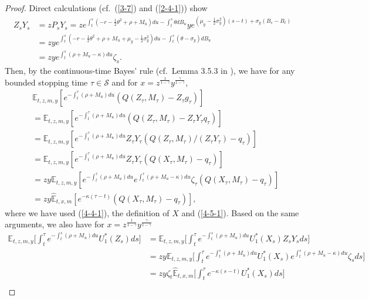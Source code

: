 \documentclass[a4paper,11pt]{amsart}
\numberwithin{equation}{section}
\newcommand{\blue}[1]{{\color{black}#1}}
\begin{document}
{\begin{proof}
Direct calculations (cf.\ (\ref{3-7}) and (\ref{2-4-1})) show 
\begin{align}\label{4-5-1}
Z_s Y_s &= z P_s Y_s= ze^{\int^s_t (-r -\frac{1}{2}\theta^2+\rho+ M_u) du  -\int^s_t \theta dB_u} y e^{(\mu_y -\frac{1}{2}\sigma_y^2)(s-t)+ \sigma_y (B_s-B_t)}\nonumber \\
&=z y e^{\int^s_t (-r -\frac{1}{2}\theta^2+\rho+ M_u +\mu_y -\frac{1}{2}\sigma_y^2  ) du  -\int^s_t (\theta-\sigma_y) dB_u  }\nonumber \\
&=z y e^{\int^s_t (\rho+ M_u-\kappa) du} \zeta_s.
\end{align}
Then, by the continuous-time Bayes' rule (cf.\ Lemma 3.5.3 in \citet{karatzas2012brownian}), we have \blue{for any bounded stopping time $\tau\in\mathcal S$} and for $x=z^{\frac{1}{1-\gamma}}y^{\frac{\gamma}{1-\gamma}}$,
\begin{align}\label{4-6}
&\mathbb{E}_{t,z,m,y}[e^{-\int^{\tau}_t (\rho+ M_u) du}(Q( Z_{\tau}, M_{\tau})-Z_{\tau}g_\tau ) ]\nonumber\\
&=\mathbb{E}_{t,z,m,y}[e^{-\int^{\tau}_t (\rho+ M_u) du}(Q( Z_{\tau}, M_{\tau})-Z_{\tau}Y_\tau q_\tau ) ]\nonumber\\
&=\mathbb{E}_{t,z,m,y}[e^{-\int^{\tau}_t (\rho+ M_u) du}Z_\tau Y_\tau (Q( Z_{\tau}, M_{\tau})/(Z_\tau Y_\tau)- q_\tau ) ]\nonumber\\
&=\mathbb{E}_{t,z,m,y}[e^{-\int^{\tau}_t (\rho+ M_u) du}Z_\tau Y_\tau (Q( X_\tau, M_\tau)- q_\tau ) ]\nonumber \\
&=zy\mathbb{E}_{t,z,m,y}[e^{-\int^{\tau}_t (\rho+ M_u) du} e^{\int^\tau_t (\rho+ M_u-\kappa) du} \zeta_\tau (Q( X_\tau, M_\tau)- q_\tau ) ]\nonumber\\
&=zy\widehat{\mathbb{E}}_{t,x,m}[e^{-\kappa(\tau-t)}  (Q(X_\tau, M_\tau)- q_\tau ) ],
\end{align}
where we have used (\ref{4-4-1}), the definition of $X$ and (\ref{4-5-1}).
Based on the same arguments, we also have for $x=z^{\frac{1}{1-\gamma}}y^{\frac{\gamma}{1-\gamma}}$
\begin{align}\label{4-7}
\mathbb{E}_{t,z,m,y}\bigg[    \int_t^{\tau }  e^{-\int^s_t (\rho+ M_u) du} {U}^\ast_1(Z_s) ds\bigg]&= \mathbb{E}_{t,z,m,y}\bigg[    \int_t^{\tau }  e^{-\int^s_t (\rho+ M_u) du} {U}^\ast_1(X_s) Z_sY_s ds\bigg]\nonumber\\
&=  z y\mathbb{E}_{t,z,m,y}\bigg[    \int_t^{\tau }  e^{-\int^s_t (\rho+ M_u) du} {U}^\ast_1(X_s) e^{\int^s_t (\rho+ M_u-\kappa) du} \zeta_s ds\bigg]\nonumber\\
&= zy\zeta_t \widehat{\mathbb{E}}_{t,x,m}\bigg[    \int_t^{\tau }  e^{-\kappa(s-t)} {U}^\ast_1(X_s) ds\bigg]\nonumber\\

\end{align}
\end{proof}}
\end{document}

